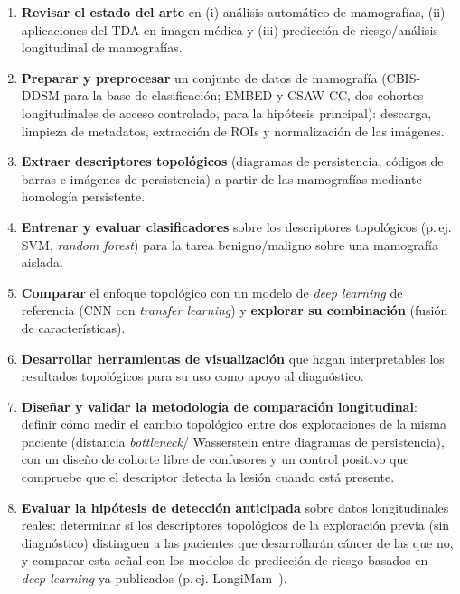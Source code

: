 \begin{enumerate}
  \item[\textbf{O1.}] \textbf{Revisar el estado del arte} en (i) análisis
        automático de mamografías, (ii) aplicaciones del TDA en imagen médica
        y (iii) predicción de riesgo/análisis longitudinal de mamografías.
  \item[\textbf{O2.}] \textbf{Preparar y preprocesar} un conjunto de datos de
        mamografía (\mbox{CBIS-DDSM} para la base de clasificación;
        \mbox{EMBED} y \mbox{CSAW-CC}, dos cohortes longitudinales de acceso
        controlado, para la hipótesis principal): descarga, limpieza de
        metadatos, extracción de ROIs y normalización de las imágenes.
  \item[\textbf{O3.}] \textbf{Extraer descriptores topológicos} (diagramas de
        persistencia, códigos de barras e imágenes de persistencia) a partir de
        las mamografías mediante homología persistente.
  \item[\textbf{O4.}] \textbf{Entrenar y evaluar clasificadores} sobre los
        descriptores topológicos (p.\,ej. SVM, \textit{random forest}) para la
        tarea benigno/maligno sobre una mamografía aislada.
  \item[\textbf{O5.}] \textbf{Comparar} el enfoque topológico con un modelo de
        \textit{deep learning} de referencia (CNN con \textit{transfer
        learning}) y \textbf{explorar su combinación} (fusión de
        características).
  \item[\textbf{O6.}] \textbf{Desarrollar herramientas de visualización} que
        hagan interpretables los resultados topológicos para su uso como apoyo
        al diagnóstico.
  \item[\textbf{O7.}] \textbf{Diseñar y validar la metodología de comparación
        longitudinal}: definir cómo medir el cambio topológico entre dos
        exploraciones de la misma paciente (distancia \textit{bottleneck}/
        Wasserstein entre diagramas de persistencia), con un diseño de
        cohorte libre de confusores y un control positivo que compruebe
        que el descriptor detecta la lesión cuando está presente.
  \item[\textbf{O8.}] \textbf{Evaluar la hipótesis de detección anticipada}
        sobre datos longitudinales reales: determinar si los descriptores
        topológicos de la exploración previa (sin diagnóstico) distinguen a
        las pacientes que desarrollarán cáncer de las que no, y comparar esta
        señal con los modelos de predicción de riesgo basados en \textit{deep
        learning} ya publicados (p.\,ej. LongiMam~\cite{rakez2025longimam}).
\end{enumerate}

